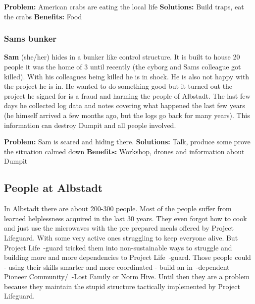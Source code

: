 \textbf{Problem:} American crabs are eating the local life
\textbf{Solutions:} Build traps, eat the crabs
\textbf{Benefits:} Food

\subsubsection{Sams bunker}

\textbf{Sam} (she/her) hides in a bunker like control structure. It is built to house 20 people it was the home of 3 until recently (the cyborg and Sams colleague got killed). With his colleagues being killed he is in shock. He is also not happy with the project he is in. He wanted to do something good but it turned out the project he signed for is a fraud and harming the people of Albstadt. The last few days he collected log data and notes covering what happened the last few years (he himself arrived a few months ago, but the logs go back for many years). This information can destroy Dumpit and all people involved.

\textbf{Problem:} Sam is scared and hiding there.
\textbf{Solutions:} Talk, produce some prove the situation calmed down
\textbf{Benefits:} Workshop, drones and information about Dumpit


\subsection{People at Albstadt}

In Albstadt there are about 200-300 people. Most of the people suffer from learned helplessness acquired in the last 30 years. They even forgot how to cook and just use the microwaves with the pre prepared meals offered by Project Lifeguard. With some very active ones struggling to keep everyone alive. But Project Life~-guard tricked them into non-sustainable ways to struggle and building more and more dependencies to Project Life~-guard. Those people could - using their skills smarter and more coordinated - build an in~-dependent Pioneer Community/~-Lost Family or Norm Hive. Until then they are a problem because they maintain the stupid structure tactically implemented by Project Lifeguard.

